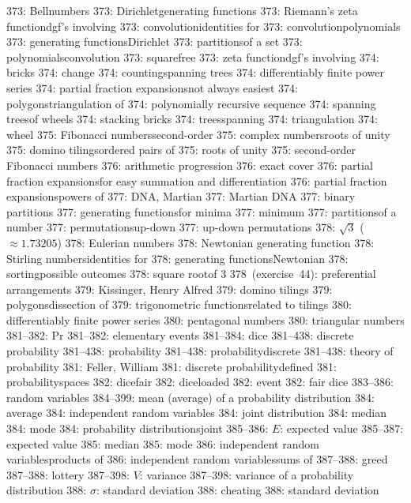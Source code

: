 373: Bell\sub numbers
373: Dirichlet\sub generating functions
373: Riemann's zeta function\sub dgf's involving
373: convolution\sub identities for
373: convolution\sub polynomials
373: generating functions\sub Dirichlet
373: partitions\sub of a set
373: polynomials\sub convolution
373: squarefree
373: zeta function\sub dgf's involving
374: bricks
374: change
374: counting\sub spanning trees
374: differentiably finite power series
374: partial fraction expansions\sub not always easiest
374: polygons\sub triangulation of
374: polynomially recursive sequence
374: spanning trees\sub of wheels
374: stacking bricks
374: trees\sub spanning
374: triangulation
374: wheel
375: Fibonacci numbers\sub second-order
375: complex numbers\sub roots of unity
375: domino tilings\sub ordered pairs of
375: roots of unity
375: second-order Fibonacci numbers
376: arithmetic progression
376: exact cover
376: partial fraction expansions\sub for easy summation and differentiation
376: partial fraction expansions\sub powers of
377: DNA, Martian
377: Martian DNA
377: binary partitions
377: generating functions\sub for minima
377: minimum
377: partitions\sub of a number
377: permutations\sub up-down
377: up-down permutations
378: $\sqrt3$ ($\approx1.73205$)
378: Eulerian numbers
378: Newtonian generating function
378: Stirling numbers\sub identities for
378: generating functions\sub Newtonian
378: sorting\sub possible outcomes
378: square root\sub of $3$
378~(exercise~44): preferential arrangements
379: Kissinger, Henry Alfred
379: domino tilings
379: polygons\sub dissection of
379: trigonometric functions\sub related to tilings
380: differentiably finite power series
380: pentagonal numbers
380: triangular numbers
381--382: Pr
381--382: elementary events
381--384: dice
381--438: discrete probability
381--438: probability
381--438: probability\sub discrete
381--438: theory of probability
381: Feller, William
381: discrete probability\sub defined
381: probability\sub spaces
382: dice\sub fair
382: dice\sub loaded
382: event
382: fair dice
383--386: random variables
384--399: mean (average) of a probability distribution
384: average
384: independent random variables
384: joint distribution
384: median
384: mode
384: probability distributions\sub joint
385--386: $E$: expected value
385--387: expected value
385: median
385: mode
386: independent random variables\sub products of
386: independent random variables\sub sums of
387--388: greed
387--388: lottery
387--398: $V$: variance
387--398: variance of a probability distribution
388: $\sigma$: standard deviation
388: cheating
388: standard deviation
